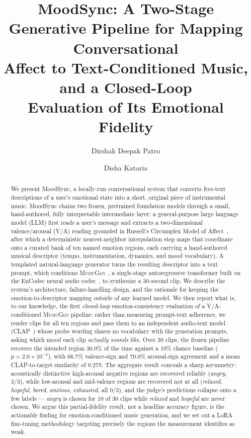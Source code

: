 \documentclass[11pt]{article}
\title{\textbf{MoodSync: A Two-Stage Generative Pipeline for Mapping Conversational\\ Affect to Text-Conditioned Music, and a Closed-Loop\\ Evaluation of Its Emotional Fidelity}}
\author[1]{Dirshak Deepak Patro}
\author[1]{Disha Kataria}
\affil[1]{Independent Research}
\date{}
\newcommand{\musicgen}{\textsc{MusicGen}}
\begin{document}
\maketitle

\begin{abstract}
We present MoodSync, a locally-run conversational system that converts free-text descriptions of a user's emotional state into a short, original piece of instrumental music. MoodSync chains two frozen, pretrained foundation models through a small, hand-authored, fully interpretable intermediate layer: a general-purpose large language model (LLM) first reads a user's message and extracts a two-dimensional valence/arousal (V/A) reading grounded in Russell's Circumplex Model of Affect~\cite{russell1980circumplex}, after which a deterministic nearest-neighbor interpolation step maps that coordinate onto a curated bank of ten named emotion regions, each carrying a hand-authored musical descriptor (tempo, instrumentation, dynamics, and mood vocabulary). A templated natural-language generator turns the resulting descriptor into a text prompt, which conditions \musicgen{}~\cite{copet2023musicgen}, a single-stage autoregressive transformer built on the EnCodec neural audio codec~\cite{defossez2022encodec}, to synthesize a 30-second clip. We describe the system's architecture, failure-handling design, and the rationale for keeping the emotion-to-descriptor mapping outside of any learned model. We then report what is, to our knowledge, the first \emph{closed-loop} emotion-consistency evaluation of a V/A-conditioned \musicgen{} pipeline: rather than measuring prompt-text adherence, we render clips for all ten regions and pass them to an independent audio-text model (CLAP~\cite{wu2023clap}) whose probe wording shares no vocabulary with the generation prompts, asking which mood each clip \emph{actually sounds like}. Over 30 clips, the frozen pipeline recovers the intended region 30.0\% of the time against a 10\% chance baseline ($p = 2.0\times10^{-3}$), with 66.7\% valence-sign and 70.0\% arousal-sign agreement and a mean CLAP-to-target similarity of 0.275. The aggregate result conceals a sharp asymmetry: acoustically distinctive high-arousal negative regions are recovered reliably (\emph{angry}, 3/3), while low-arousal and mid-valence regions are recovered not at all (\emph{relaxed}, \emph{hopeful}, \emph{bored}, \emph{anxious}, \emph{exhausted}, all 0/3), and the judge's predictions collapse onto a few labels --- \emph{angry} is chosen for 10 of 30 clips while \emph{relaxed} and \emph{hopeful} are never chosen. We argue this partial-fidelity result, not a headline accuracy figure, is the actionable finding for emotion-conditioned music generation, and we set out a LoRA fine-tuning methodology targeting precisely the regions the measurement identifies as weak.
\end{abstract}
\end{document}
